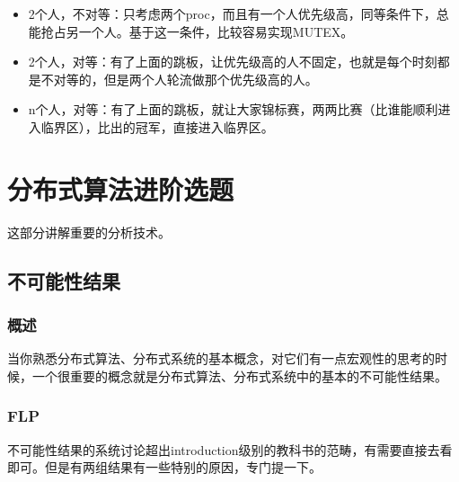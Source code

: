 \documentclass[UTF8]{ctexrep}
\begin{document}
\begin{itemize}
    \item 2个人，不对等：只考虑两个proc，而且有一个人优先级高，同等条件下，总能抢占另一个人。基于这一条件，比较容易实现MUTEX。
    
    \item 2个人，对等：有了上面的跳板，让优先级高的人不固定，也就是每个时刻都是不对等的，但是两个人轮流做那个优先级高的人。
    
    \item n个人，对等：有了上面的跳板，就让大家锦标赛，两两比赛（比谁能顺利进入临界区），比出的冠军，直接进入临界区。
\end{itemize}


\part{分布式算法进阶选题}

这部分讲解重要的分析技术。

\chapter{不可能性结果}

\section{概述}

当你熟悉分布式算法、分布式系统的基本概念，对它们有一点宏观性的思考的时候，一个很重要的概念就是分布式算法、分布式系统中的基本的不可能性结果。


\section{FLP}

不可能性结果的系统讨论超出introduction级别的教科书的范畴，有需要直接去看\cite{Attiya14}即可。但是有两组结果有一些特别的原因，专门提一下。
\end{document}
